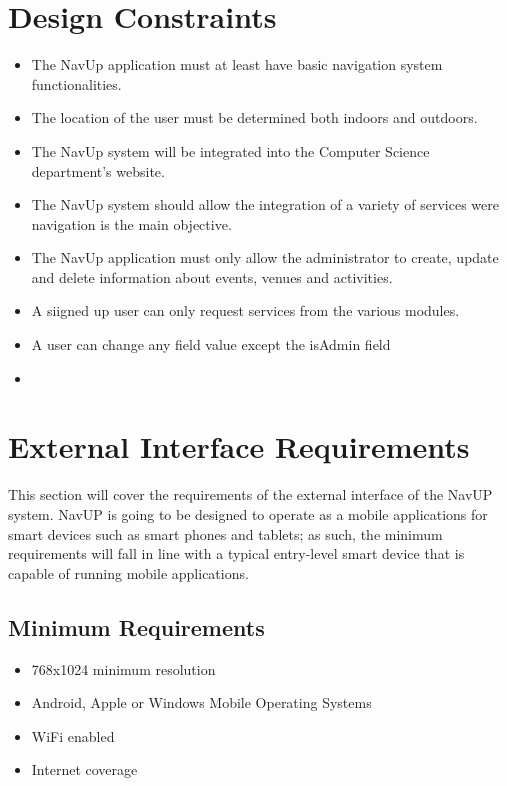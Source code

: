 \documentclass[12pt,a4paper]{article}
\begin{document}


\tableofcontents
\newpage

\section{Design Constraints}
	\begin{itemize}
		\item The NavUp application must at least have basic navigation system functionalities.
		\item The location  of the user must be determined both indoors and outdoors.
		\item The NavUp system will be integrated into the Computer Science department's website.
		\item The NavUp system should allow the integration of a variety of services were navigation is the main objective.
		\item The NavUp application must only allow the administrator to create, update and delete information about events, venues and activities.
		\item A siigned up user can only request services from the various modules.
		\item A user can change any field value except the isAdmin field
		\item 
 
		
	\end{itemize}
    
\section{External Interface Requirements}
This section will cover the requirements of the external interface of the NavUP system. NavUP is going to be designed to operate as a mobile applications for smart devices such as smart phones and tablets; as such, the minimum requirements will fall in line with a typical entry-level smart device that is capable of running mobile applications.\newline

    \subsection{Minimum Requirements}
        \begin{itemize}
            \item 768x1024 minimum resolution
            \item Android, Apple or Windows Mobile Operating Systems
            \item WiFi enabled
            \item Internet coverage
        \end{itemize}
     
\end{document}
